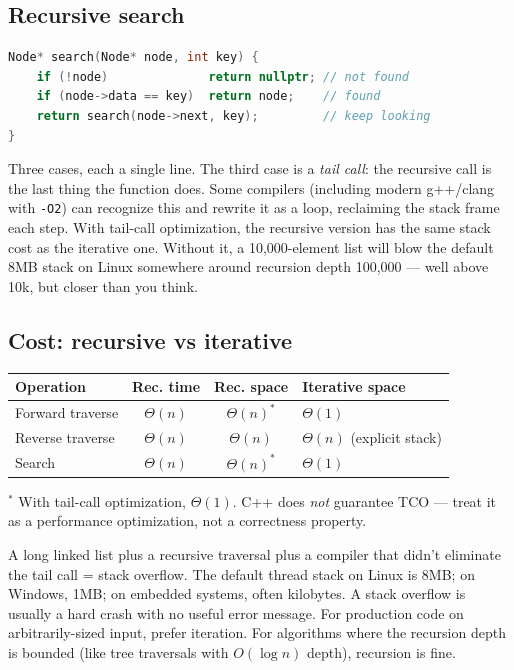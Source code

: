 \documentclass[11pt]{article}
\begin{document}
\subsection*{Recursive search}

\begin{examplebox}
\begin{lstlisting}[language=C++,basicstyle=\ttfamily\small,frame=single]
Node* search(Node* node, int key) {
    if (!node)              return nullptr; // not found
    if (node->data == key)  return node;    // found
    return search(node->next, key);         // keep looking
}
\end{lstlisting}
\end{examplebox}

Three cases, each a single line. The third case is a \emph{tail
call}: the recursive call is the last thing the function does.
Some compilers (including modern g++/clang with \texttt{-O2}) can
recognize this and rewrite it as a loop, reclaiming the stack
frame each step. With tail-call optimization, the recursive
version has the same stack cost as the iterative one. Without
it, a 10,000-element list will blow the default 8MB stack on
Linux somewhere around recursion depth 100,000 --- well above
10k, but closer than you think.

\subsection*{Cost: recursive vs iterative}

\begin{center}
\begin{tabular}{|l|c|c|l|}
\hline
\textbf{Operation} & \textbf{Rec. time} & \textbf{Rec. space} & \textbf{Iterative space} \\
\hline
Forward traverse  & $\Theta(n)$ & $\Theta(n)^*$ & $\Theta(1)$ \\
Reverse traverse  & $\Theta(n)$ & $\Theta(n)$   & $\Theta(n)$ (explicit stack) \\
Search            & $\Theta(n)$ & $\Theta(n)^*$ & $\Theta(1)$ \\
\hline
\end{tabular}
\end{center}

\noindent$^*$ With tail-call optimization, $\Theta(1)$. C++ does
\emph{not} guarantee TCO --- treat it as a performance
optimization, not a correctness property.

\begin{warnbox}
A long linked list plus a recursive traversal plus a compiler
that didn't eliminate the tail call = stack overflow. The default
thread stack on Linux is 8MB; on Windows, 1MB; on embedded
systems, often kilobytes. A stack overflow is usually a hard
crash with no useful error message. For production code on
arbitrarily-sized input, prefer iteration. For algorithms where
the recursion depth is bounded (like tree traversals with
$O(\log n)$ depth), recursion is fine.
\end{warnbox}
\end{document}
